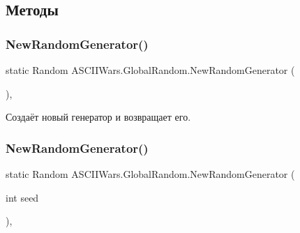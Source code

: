 \subsection{Методы}
\hypertarget{class_a_s_c_i_i_wars_1_1_global_random_ad40c313d502809aad3398da0e8d1d8e6}{}\label{class_a_s_c_i_i_wars_1_1_global_random_ad40c313d502809aad3398da0e8d1d8e6} 
\subsubsection{\texorpdfstring{New\+Random\+Generator()}{NewRandomGenerator()}\hspace{0.1cm}{\footnotesize\ttfamily [1/2]}}
{\footnotesize\ttfamily static Random A\+S\+C\+I\+I\+Wars.\+Global\+Random.\+New\+Random\+Generator (\begin{DoxyParamCaption}{ }\end{DoxyParamCaption})\hspace{0.3cm}{\ttfamily [inline]}, {\ttfamily [static]}}



Создаёт новый генератор и возвращает его. 

\hypertarget{class_a_s_c_i_i_wars_1_1_global_random_a781ebf6e30b09d6b5ec1f97a2337564b}{}\label{class_a_s_c_i_i_wars_1_1_global_random_a781ebf6e30b09d6b5ec1f97a2337564b} 
\subsubsection{\texorpdfstring{New\+Random\+Generator()}{NewRandomGenerator()}\hspace{0.1cm}{\footnotesize\ttfamily [2/2]}}
{\footnotesize\ttfamily static Random A\+S\+C\+I\+I\+Wars.\+Global\+Random.\+New\+Random\+Generator (\begin{DoxyParamCaption}\item[{int}]{seed }\end{DoxyParamCaption})\hspace{0.3cm}{\ttfamily [inline]}, {\ttfamily [static]}}



